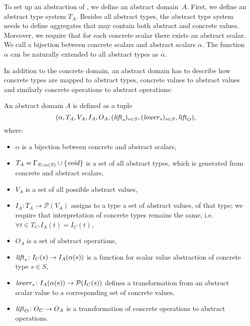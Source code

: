 To set up an abstraction of \LLVM, we define an abstract domain~$A$. First, we
define an abstract type system $T_A$. Besides all abstract types, the abstract type
system needs to define aggregates that may contain both abstract and concrete
values. Moreover, we require that for each concrete scalar there exists an abstract scalar.
We call a bijection between concrete scalars and abstract scalars $\alpha$. The
function $\alpha$ can be naturally extended to all abstract types as $\overline{\alpha}$.

In addition to the concrete domain, an abstract domain has to describe how concrete
types are mapped to abstract types, concrete values to abstract values and
similarly concrete operations to abstract operations:
\begin{definition}
    An abstract domain $A$ is defined as a tuple
    \[(\alpha, T_A, V_A, I_A, O_A, (\mathit{lift}_s)_{s \in S}, (\mathit{lower}_s)_{s \in
    S}, \mathit{lift}_O),\] where:
\begin{itemize}
    \item $\alpha$ is a bijection between concrete and abstract scalars,
    \item $T_A = \Gamma_{S \cup \alpha( S )} \cup \{\mathit{void}\}$ is a set of all abstract types,
        which is generated from concrete and abstract scalars,
    \item $V_A$ is a set of all possible abstract values,
    \item $I_A \colon T_A \to \mathcal{P}(V_A)$ assigns to a type a set of
        abstract values, of that type; we require that interpretation of
        concrete types remains the same, i.e.~$\forall t \in T_C . I_A( t ) =
        I_C( t )$,
    \item $O_A$ is a set of abstract operations,
    \item $\mathit{lift}_s \colon I_C( s ) \to I_A( \alpha( s ) )$ is a function
        for scalar value abstraction of concrete type $s \in S$,
    \item $\mathit{lower}_s \colon I_A( \alpha( s ) ) \to \mathcal{P}( I_C( s ) )$ defines a
        transformation from an abstract scalar value to a corresponding set of concrete values,
    \item $\mathit{lift}_O \colon O_C \to O_A$ is a transformation of
        concrete operations to abstract operations.
\end{itemize}
\end{definition}

